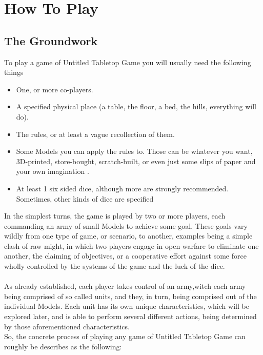 \documentclass[a4paper,12pt]{report}
\begin{document}
\chapter{How To Play}

\section {The Groundwork}
To play a game of Untitled Tabletop Game you will usually need the following things

\begin{adjustwidth}{-2cm}{-2cm}
\begin{multicols}{3}
\begin{itemize}

	\item One, or more co-players.
	\item A specified physical place (a table, the floor, a bed, the hills, everything will do).
	\item The rules, or at least a vague recollection of them.
	\item Some Models you can apply the rules to. Those can be whatever you want, 3D-printed, store-bought, scratch-built, or even just some slips of paper and your own imagination .
	\item At least 1 six sided dice, although more are strongly recommended. Sometimes, other kinds of dice are specified
	
\end{itemize}
\end{multicols}
\end{adjustwidth}


In the simplest turns, the game is played by two or more  players, each commanding an army of small Models to achieve some goal. These goals vary wildly from one type of game, or scenario, to another, examples being a simple clash of raw might, in which two players engage in open warfare to eliminate one another, the claiming of objectives, or a cooperative effort against some force wholly controlled by the systems of the game and the luck of the dice.\\
\\

As already established, each player takes control of an army,witch each army being comprised of so called units, and they, in turn, being comprised out of the individual Models. Each unit has its own unique characteristics, which will be explored later, and is able to perform several different actions,  being determined by those aforementioned characteristics.\\
\newpage
So, the concrete process of playing any game of Untitled Tabletop Game can roughly be describes as the following:\\
\end{document}
